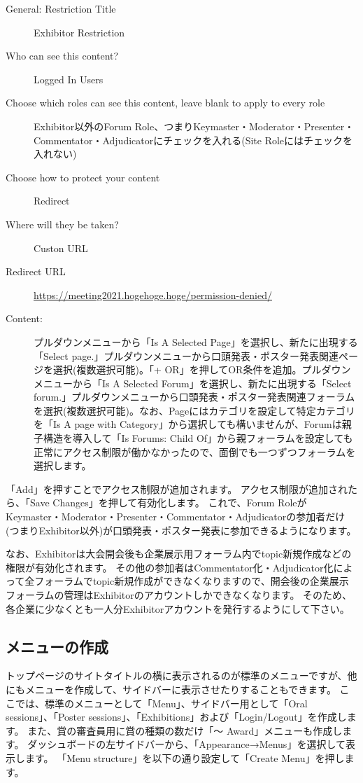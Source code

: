 \documentclass[titlepage,10pt,a4paper,uplatex]{jsbook}
\begin{document}
\begin{description}
\item[General: Restriction Title] Exhibitor Restriction
\item[Who can see this content?] Logged In Users
\item[Choose which roles can see this content, leave blank to apply to every role] Exhibitor以外のForum Role、つまりKeymaster・Moderator・Presenter・Commentator・Adjudicatorにチェックを入れる(Site Roleにはチェックを入れない)
\item[Choose how to protect your content] Redirect
\item[Where will they be taken?] Custon URL
\item[Redirect URL] \url{https://meeting2021.hogehoge.hoge/permission-denied/}
\item[Content: ] プルダウンメニューから「Is A Selected Page」を選択し、新たに出現する「Select page.」プルダウンメニューから口頭発表・ポスター発表関連ページを選択(複数選択可能)。「+ OR」を押してOR条件を追加。プルダウンメニューから「Is A Selected Forum」を選択し、新たに出現する「Select forum.」プルダウンメニューから口頭発表・ポスター発表関連フォーラムを選択(複数選択可能)。なお、Pageにはカテゴリを設定して特定カテゴリを「Is A page with Category」から選択しても構いませんが、Forumは親子構造を導入して「Is Forums: Child Of」から親フォーラムを設定しても正常にアクセス制限が働かなかったので、面倒でも一つずつフォーラムを選択します。
\end{description}

「Add」を押すことでアクセス制限が追加されます。
アクセス制限が追加されたら、「Save Changes」を押して有効化します。
これで、Forum RoleがKeymaster・Moderator・Presenter・Commentator・Adjudicatorの参加者だけ(つまりExhibitor以外)が口頭発表・ポスター発表に参加できるようになります。

なお、Exhibitorは大会開会後も企業展示用フォーラム内でtopic新規作成などの権限が有効化されます。
その他の参加者はCommentator化・Adjudicator化によって全フォーラムでtopic新規作成ができなくなりますので、開会後の企業展示フォーラムの管理はExhibitorのアカウントしかできなくなります。
そのため、各企業に少なくとも一人分Exhibitorアカウントを発行するようにして下さい。

\subsection{メニューの作成}

トップページのサイトタイトルの横に表示されるのが標準のメニューですが、他にもメニューを作成して、サイドバーに表示させたりすることもできます。
ここでは、標準のメニューとして「Menu」、サイドバー用として「Oral sessions」、「Poster sessions」、「Exhibitions」および「Login/Logout」を作成します。
また、賞の審査員用に賞の種類の数だけ「～ Award」メニューも作成します。
ダッシュボードの左サイドバーから、「Appearance→Menus」を選択して表示します。
「Menu structure」を以下の通り設定して「Create Menu」を押します。
\end{document}
